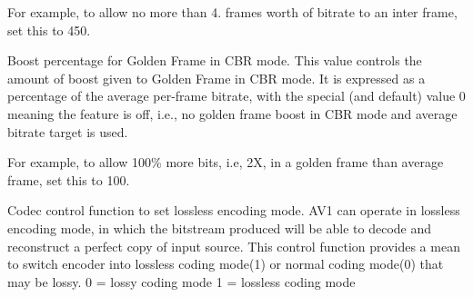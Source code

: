 \begin{Desc}
\begin{description}
For example, to allow no more than 4. frames worth of bitrate to an inter frame, set this to 450. \item[{\em 
A\+V1\+E\+\_\+\+S\+E\+T\+\_\+\+G\+F\+\_\+\+C\+B\+R\+\_\+\+B\+O\+O\+S\+T\+\_\+\+P\+CT\hypertarget{group__aom__encoder_ggae78dde67a6d78f332e9bdba0dde42db5ade327180f01d27d22abd94c1f0a8bc9e}{}\label{group__aom__encoder_ggae78dde67a6d78f332e9bdba0dde42db5ade327180f01d27d22abd94c1f0a8bc9e}
}]Boost percentage for Golden Frame in C\+BR mode. This value controls the amount of boost given to Golden Frame in C\+BR mode. It is expressed as a percentage of the average per-\/frame bitrate, with the special (and default) value 0 meaning the feature is off, i.\+e., no golden frame boost in C\+BR mode and average bitrate target is used.

For example, to allow 100\% more bits, i.\+e, 2X, in a golden frame than average frame, set this to 100. \item[{\em 
A\+V1\+E\+\_\+\+S\+E\+T\+\_\+\+L\+O\+S\+S\+L\+E\+SS\hypertarget{group__aom__encoder_ggae78dde67a6d78f332e9bdba0dde42db5afe875c6bb02f236be503c8c7b1f15875}{}\label{group__aom__encoder_ggae78dde67a6d78f332e9bdba0dde42db5afe875c6bb02f236be503c8c7b1f15875}
}]Codec control function to set lossless encoding mode. A\+V1 can operate in lossless encoding mode, in which the bitstream produced will be able to decode and reconstruct a perfect copy of input source. This control function provides a mean to switch encoder into lossless coding mode(1) or normal coding mode(0) that may be lossy. 0 = lossy coding mode 1 = lossless coding mode


\end{description}
\end{Desc}

